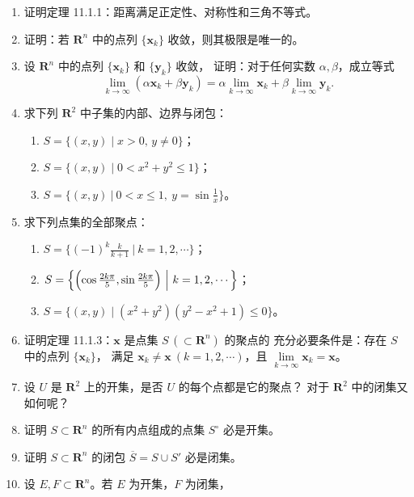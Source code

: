 \documentclass[11pt]{ctexart}
\theoremstyle{plain}
\theoremstyle{definition}
\theoremstyle{remark}
\begin{document}
\begin{enumerate}
  \item 证明定理 11.1.1：距离满足正定性、对称性和三角不等式。
  \item 证明：若 \(\mathbf{R}^n\) 中的点列 \(\{\boldsymbol{x}_k\}\) 收敛，则其极限是唯一的。
  \item 设 \(\mathbf{R}^n\) 中的点列 \(\{\boldsymbol{x}_k\}\) 和 \(\{\boldsymbol{y}_k\}\) 收敛，
        证明：对于任何实数 \(\alpha,\beta\)，成立等式
        \[
          \lim_{k\to\infty}(\alpha\boldsymbol{x}_k+\beta\boldsymbol{y}_k)
          =\alpha\lim_{k\to\infty}\boldsymbol{x}_k+\beta\lim_{k\to\infty}\boldsymbol{y}_k .
        \]
  \item 求下列 \(\mathbf{R}^2\) 中子集的内部、边界与闭包：
        \begin{enumerate}
          \item[(1)] \(S=\{(x,y)\mid x>0,\,y\neq 0\}\)；
          \item[(2)] \(S=\{(x,y)\mid 0<x^2+y^2\le 1\}\)；
          \item[(3)] \(S=\bigl\{(x,y)\ \big|\ 0<x\le 1,\ y=\sin\tfrac{1}{x}\bigr\}\)。
        \end{enumerate}
  \item 求下列点集的全部聚点：
        \begin{enumerate}
          \item[(1)] \(S=\bigl\{(-1)^k\tfrac{k}{k+1}\ \big|\ k=1,2,\cdots\bigr\}\)；
          \item[(2)] \(S=\Bigl\{\Bigl(\cos\tfrac{2k\pi}{5},\sin\tfrac{2k\pi}{5}\Bigr)
                \ \Big|\ k=1,2,\cdots\Bigr\}\)；
          \item[(3)] \(S=\{(x,y)\mid (x^2+y^2)(y^2-x^2+1)\le 0\}\)。
        \end{enumerate}
  \item 证明定理 11.1.3：\(\boldsymbol{x}\) 是点集 \(S\,(\subset\mathbf{R}^n)\) 的聚点的
        充分必要条件是：存在 \(S\) 中的点列 \(\{\boldsymbol{x}_k\}\)，
        满足 \(\boldsymbol{x}_k\neq\boldsymbol{x}\ (k=1,2,\cdots)\)，且
        \(\lim\limits_{k\to\infty}\boldsymbol{x}_k=\boldsymbol{x}\)。
  \item 设 \(U\) 是 \(\mathbf{R}^2\) 上的开集，是否 \(U\) 的每个点都是它的聚点？
        对于 \(\mathbf{R}^2\) 中的闭集又如何呢？
  \item 证明 \(S\subset\mathbf{R}^n\) 的所有内点组成的点集 \(S^\circ\) 必是开集。
  \item 证明 \(S\subset\mathbf{R}^n\) 的闭包 \(\overline{S}=S\cup S'\) 必是闭集。
  \item 设 \(E,F\subset\mathbf{R}^n\)。若 \(E\) 为开集，\(F\) 为闭集，

\end{enumerate}
\end{document}
